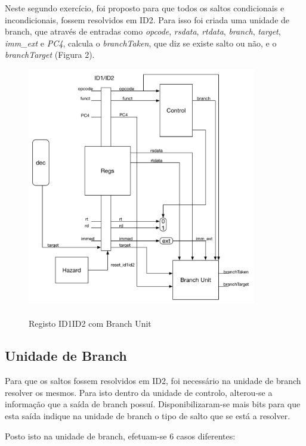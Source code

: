 \documentclass[pdftex,12pt,a4paper]{report}
\begin{document}
Neste segundo exercício, foi proposto para que todos os saltos condicionais e incondicionais, fossem resolvidos em ID2. Para isso foi criada uma unidade de branch, que através de entradas como \textit{opcode}, \textit{rsdata}, \textit{rtdata}, \textit{branch}, \textit{target}, \textit{imm\_ext} e \textit{PC4}, calcula o \textit{branchTaken}, que diz se existe salto ou não, e o \textit{branchTarget} (Figura 2).

\begin{figure}[!htb]
\center
 \includegraphics[width=100mm,scale=1]{ID1ID2ex2.pdf}
 \caption{\\Registo ID1ID2 com Branch Unit}\label{fig:ex2RegID1ID2}
\end{figure}

\subsection{Unidade de Branch}

Para que os saltos fossem resolvidos em ID2, foi necessário na unidade de branch resolver os mesmos. Para isto dentro da unidade de controlo, alterou-se a informação que a saída de branch possuí. Disponibilizaram-se mais bits para que esta saída indique na unidade de branch o tipo de salto que se está a resolver.

Posto isto na unidade de branch, efetuam-se 6 casos diferentes:
\end{document}
